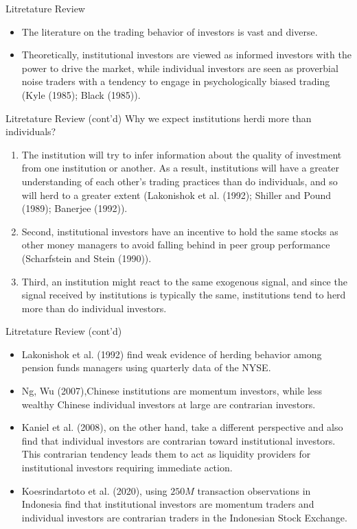 \documentclass{beamer}
\begin{document}
\begin{frame}{Litretature Review}
    \begin{itemize}
        \item The literature on the trading behavior of investors is vast and diverse.
        \item Theoretically, institutional investors are viewed as informed investors with the power to drive the market, while individual investors are seen as proverbial noise traders with a tendency to engage in psychologically biased trading (Kyle (1985); Black (1985)).
    \end{itemize}
\end{frame}

\begin{frame}{Litretature Review (cont'd)}
    Why we expect institutions herdi more than individuals?
    \begin{enumerate}
        \item The institution will try to infer information about the quality of investment from one institution or another. As a result, institutions will have a greater understanding of each other’s trading practices than do individuals, and so will herd to a greater extent (Lakonishok et al. (1992); Shiller and Pound (1989); Banerjee (1992)).
        \item Second, institutional investors have an incentive to hold the same stocks as other money managers to avoid falling behind in peer group performance (Scharfstein and Stein (1990)).
        \item Third, an institution might react to the same exogenous signal, and since the signal received by institutions is typically the same, institutions tend to herd more than do individual investors.
    \end{enumerate}
\end{frame}

\begin{frame}{Litretature Review (cont'd)}
    \begin{itemize}
        \item Lakonishok et al. (1992) find weak evidence of herding behavior among pension funds managers using quarterly data of the NYSE.
        \item Ng, Wu (2007),Chinese institutions are momentum investors, while less wealthy Chinese individual investors at large are contrarian investors.
        \item Kaniel et al. (2008), on the other hand, take a different perspective and also find that individual investors are contrarian toward institutional investors. This contrarian tendency leads them to act as liquidity providers for institutional investors requiring immediate action.
        \item Koesrindartoto et al. (2020), using \(250 M\) transaction observations in Indonesia find that institutional investors are momentum traders and individual investors are contrarian traders in the Indonesian Stock Exchange.
    \end{itemize}
\end{frame}
\end{document}
